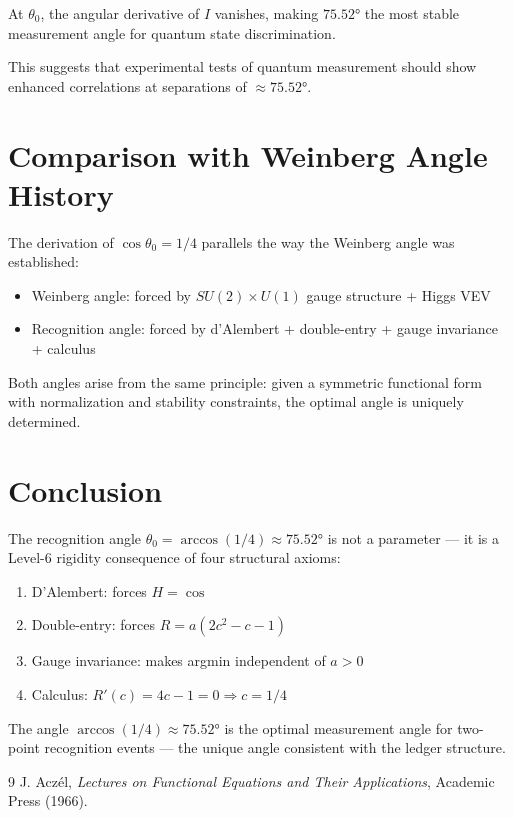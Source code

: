 \documentclass[12pt,a4paper]{article}
\theoremstyle{definition}
\theoremstyle{remark}
\begin{document}
At $\theta_0$, the angular derivative of $I$ vanishes, making $75.52°$ the most 
stable measurement angle for quantum state discrimination.

This suggests that experimental tests of quantum measurement should show 
enhanced correlations at separations of $\approx 75.52°$.

\section{Comparison with Weinberg Angle History}

The derivation of $\cos\theta_0 = 1/4$ parallels the way the Weinberg angle was 
established:
\begin{itemize}
\item Weinberg angle: forced by $SU(2) \times U(1)$ gauge structure + Higgs VEV
\item Recognition angle: forced by d'Alembert + double-entry + gauge invariance + calculus
\end{itemize}

Both angles arise from the same principle: given a symmetric functional form with 
normalization and stability constraints, the optimal angle is uniquely determined.

\section{Conclusion}

The recognition angle $\theta_0 = \arccos(1/4) \approx 75.52°$ is not a parameter — 
it is a Level-6 rigidity consequence of four structural axioms:
\begin{enumerate}
\item D'Alembert: forces $H = \cos$
\item Double-entry: forces $R = a(2c^2 - c - 1)$
\item Gauge invariance: makes argmin independent of $a > 0$
\item Calculus: $R'(c) = 4c - 1 = 0 \Rightarrow c = 1/4$
\end{enumerate}

The angle $\arccos(1/4) \approx 75.52°$ is the optimal measurement angle for 
two-point recognition events — the unique angle consistent with the ledger structure.

\begin{thebibliography}{9}
 J. Aczél, \emph{Lectures on Functional Equations and Their Applications}, 
Academic Press (1966).
\end{thebibliography}
\end{document}

